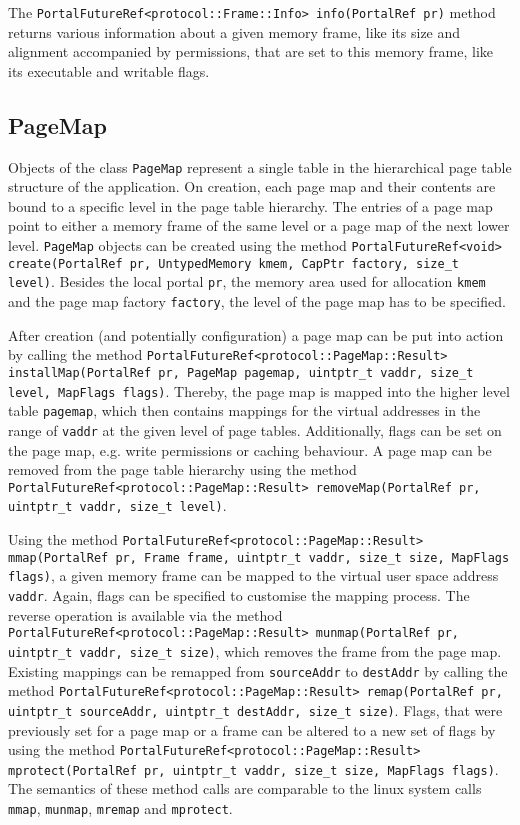 The \texttt{PortalFutureRef<protocol::Frame::Info> info(PortalRef pr)} method
returns various information about a given memory frame, like its size and
alignment accompanied by permissions, that are set to this memory frame, like
its executable and writable flags.

\subsection{PageMap}
Objects of the class \texttt{PageMap} represent a single table in the
hierarchical page table structure of the application. On creation, each page map
and their contents are bound to a specific level in the page table hierarchy.
The entries of a page map point to either a memory frame of the same level or a
page map of the next lower level.
\texttt{PageMap} objects can be created using the method
\texttt{PortalFutureRef<void> create(PortalRef pr, UntypedMemory kmem, CapPtr
factory, size\_t level)}. Besides the local portal \texttt{pr}, the memory area
used for allocation \texttt{kmem} and the page map factory \texttt{factory}, the
level of the page map has to be specified.

After creation (and potentially configuration) a page map can be put into action
by calling the method \texttt{PortalFutureRef<protocol::PageMap::Result>
installMap(PortalRef pr, PageMap pagemap, uintptr\_t vaddr, size\_t level,
MapFlags flags)}. Thereby, the page map is mapped into the higher level table
\texttt{pagemap}, which then contains mappings for the virtual addresses in the
range of \texttt{vaddr} at the given level of page tables. Additionally, flags
can be set on the page map, e.g. write permissions or caching behaviour. A page
map can be removed from the page table hierarchy using the method
\texttt{PortalFutureRef<protocol::PageMap::Result> removeMap(PortalRef pr, \\
uintptr\_t vaddr, size\_t level)}.

Using the method \texttt{PortalFutureRef<protocol::PageMap::Result> \\
mmap(PortalRef pr, Frame frame, uintptr\_t vaddr, size\_t size, MapFlags flags)},
a given memory frame can be mapped to the virtual user space address
\texttt{vaddr}. Again, flags can be specified to customise the mapping process.
The reverse operation is available via the method
\texttt{PortalFutureRef<protocol::PageMap::Result> munmap(PortalRef pr,
uintptr\_t vaddr, size\_t size)}, which removes the frame from the page map.
Existing mappings can be remapped from \texttt{sourceAddr} to \texttt{destAddr}
by calling the method \texttt{PortalFutureRef<protocol::PageMap::Result>
remap(PortalRef pr, uintptr\_t sourceAddr, uintptr\_t destAddr, size\_t size)}.
Flags, that were previously set for a page map or a frame can be altered to a
new set of flags by using the method
\texttt{PortalFutureRef<protocol::PageMap::Result> mprotect(PortalRef pr,
uintptr\_t vaddr, size\_t size, MapFlags flags)}.
The semantics of these method calls are comparable to the linux system calls
\texttt{mmap}, \texttt{munmap}, \texttt{mremap} and \texttt{mprotect}.


